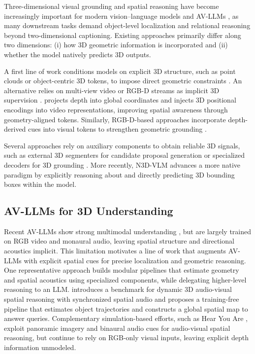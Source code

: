 Three-dimensional visual grounding and spatial reasoning have become increasingly important for modern vision–language models \citep{huang2024chat, chen2024grounded, Qwen3-VL, guo2025seed1, zhu2025internvl3} and AV-LLMs \citep{senocak2023sound, chowdhury2024meerkat, li2024groundinggpt}, as many downstream tasks demand object-level localization and relational reasoning beyond two-dimensional captioning. Existing approaches primarily differ along two dimensions: (i) how 3D geometric information is incorporated and (ii) whether the model natively predicts 3D outputs.

A first line of work conditions models on explicit 3D structure, such as point clouds or object-centric 3D tokens, to impose direct geometric constraints \citep{huang2024chat, mao2025spatiallm}. 
An alternative relies on multi-view video or RGB-D streams as implicit 3D supervision \citep{qi2025gpt4scene, zheng2025video, chen2024spatialvlm, zhu2024llava}. 
\citep{zheng2025video} projects depth into global coordinates and injects 3D positional encodings into video representations, improving spatial awareness through geometry-aligned tokens. 
Similarly, RGB-D-based approaches incorporate depth-derived cues into visual tokens to strengthen geometric grounding \citep{chen2024spatialvlm, zhu2024llava}.

Several approaches rely on auxiliary components to obtain reliable 3D signals, such as external 3D segmenters for candidate proposal generation or specialized decoders for 3D grounding \citep{zheng2025video, zhu2024llava}. More recently, N3D-VLM \citep{wang2025n3d} advances a more native paradigm by explicitly reasoning about and directly predicting 3D bounding boxes within the model.

\subsection{AV-LLMs for 3D Understanding}

Recent AV-LLMs show strong multimodal understanding \citep{cheng2024videollama, xu2025qwen2, Qwen3-Omni, tang2025video}, but are largely trained on RGB video and monaural audio, leaving spatial structure and directional acoustics implicit. This limitation motivates a line of work that augments AV-LLMs with explicit spatial cues for precise localization and geometric reasoning. One representative approach builds modular pipelines that estimate geometry and spatial acoustics using specialized components, while delegating higher-level reasoning to an LLM. \citep{chen2025savvy} introduces a benchmark for dynamic 3D audio-visual spatial reasoning with synchronized spatial audio and proposes a training-free pipeline that estimates object trajectories and constructs a global spatial map to answer queries. Complementary simulation-based efforts, such as Hear You Are \citep{ryu2025hear}, exploit panoramic imagery and binaural audio cues for audio-visual spatial reasoning, but continue to rely on RGB-only visual inputs, leaving explicit depth information unmodeled.

